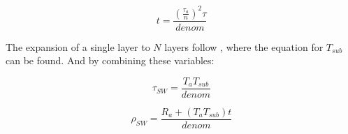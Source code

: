 \documentclass[twoside,10pt]{report}
\begin{document}
\begin{equation}
t = \frac{(\frac{\tau_a}{n})^2 \tau}{denom}
\label{leaf_optical_properties:t}
\end{equation}

The expansion of a single layer to $N$ layers follow \citet{Stokes1862}, where the equation for $T_{sub}$ can be found. And by combining these variables:

\begin{equation}
 \tau_{SW} =  \frac{T_a T_{sub}}{denom}
\label{leaf_optical_properties:transmittance}
\end{equation}

\begin{equation}
 \rho_{SW} =  \frac{R_a + (T_a T_{sub}) t}{denom}
\label{leaf_optical_properties:reflectance}
\end{equation}
\end{document}
